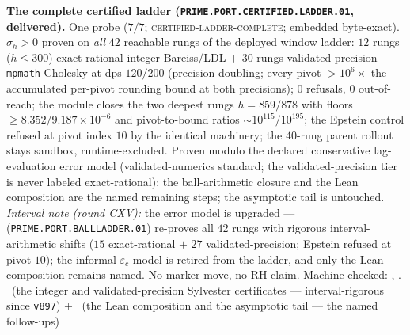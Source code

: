 \documentclass[11pt,a4paper]{article}
\theoremstyle{definition}
\begin{document}
\par\smallskip\noindent\textbf{The complete certified ladder
(\texttt{PRIME.PORT.CERTIFIED.\allowbreak LADDER.01},
delivered).}
One probe ($7/7$; \textsc{certified-ladder-complete}; embedded
byte-exact).  $\sigma_h > 0$ proven on \emph{all} $42$ reachable
rungs of the deployed window ladder: $12$ rungs ($h \le 300$)
exact-rational integer Bareiss/LDL $+$ $30$ rungs
validated-precision \texttt{mpmath} Cholesky at dps $120/200$
(precision doubling; every pivot $> 10^{6}\times$ the
accumulated per-pivot rounding bound at both precisions); $0$
refusals, $0$ out-of-reach; the module closes the two deepest
rungs $h = 859/878$ with floors $\ge
8.352/9.187\times10^{-6}$ and pivot-to-bound ratios
${\sim}10^{115}/10^{195}$; the Epstein control refused at pivot
index $10$ by the identical machinery; the $40$-rung parent
rollout stays sandbox, runtime-excluded.  Proven modulo the
declared conservative lag-evaluation error model
(validated-numerics standard; the validated-precision tier is
never labeled exact-rational); the ball-arithmetic closure and
the Lean composition are the named remaining steps; the
asymptotic tail is untouched.  \emph{Interval note (round CXV):}
the error model is upgraded ---
(\texttt{PRIME.PORT.BALLLADDER.01}) re-proves all $42$ rungs
with rigorous interval-arithmetic shifts ($15$ exact-rational
$+$ $27$ validated-precision; Epstein refused at pivot $10$);
the informal $\varepsilon_c$ model is retired from the ladder,
and only the Lean composition remains named.  No marker move, no
RH claim.
Machine-checked: ,
.
\mE\ (the integer and validated-precision Sylvester
certificates --- interval-rigorous since \texttt{v897})
$+$ \mO\ (the Lean composition and the asymptotic tail
--- the named follow-ups)
\par\smallskip
\end{document}
